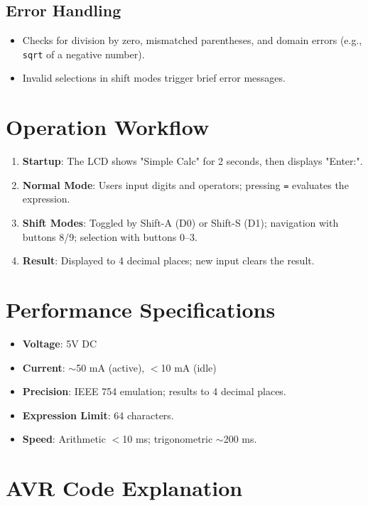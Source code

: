 \documentclass{article}
\theoremstyle{remark}
\begin{document}
\subsection{Error Handling}
\begin{itemize}[noitemsep]
    \item Checks for division by zero, mismatched parentheses, and domain errors (e.g., \texttt{sqrt} of a negative number).
    \item Invalid selections in shift modes trigger brief error messages.
\end{itemize}

\section{Operation Workflow}
\begin{enumerate}
    \item \textbf{Startup}: The LCD shows "Simple Calc" for 2 seconds, then displays "Enter:".
    \item \textbf{Normal Mode}: Users input digits and operators; pressing \texttt{=} evaluates the expression.
    \item \textbf{Shift Modes}: Toggled by Shift-A (D0) or Shift-S (D1); navigation with buttons 8/9; selection with buttons 0--3.
    \item \textbf{Result}: Displayed to 4 decimal places; new input clears the result.
\end{enumerate}

\section{Performance Specifications}
\begin{itemize}[noitemsep]
    \item \textbf{Voltage}: 5V DC
    \item \textbf{Current}: $\sim$50 mA (active), $<$10 mA (idle)
    \item \textbf{Precision}: IEEE 754 emulation; results to 4 decimal places.
    \item \textbf{Expression Limit}: 64 characters.
    \item \textbf{Speed}: Arithmetic $<$10 ms; trigonometric $\sim$200 ms.
\end{itemize}

\section{AVR Code Explanation}
\end{document}
